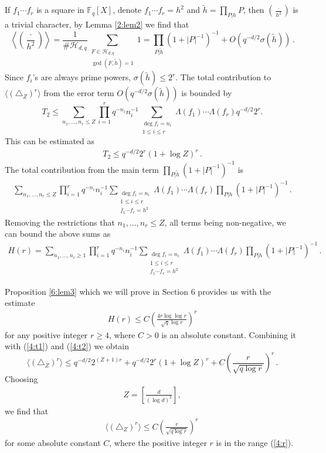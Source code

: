 \documentclass[12pt]{amsart}
\theoremstyle{plain}
\newcommand{\F}{{\mathbb F}_q}
\newcommand{\HH}{{\mathcal H}}
\begin{document}
If $f_1 \cdots f_r$ is a square in $\F[X]$, denote $f_1 \cdots f_r=h^2$ and $\widetilde{h}=\prod_{P|h}P$, then $\left(\frac{\cdot}{h^2}\right)$ is a trivial character, by Lemma \ref{2:lem2} we find that
\[ \left\langle\left(\frac{\cdot}{h^2}\right)\right \rangle = \frac{1}{\#\HH_{d,q}} \sum_{\substack{F \in \HH_{d,q}\\ \gcd(F,\widetilde{h})=1}}1= \prod_{P|\widetilde{h}}\left(1+|P|^{-1}\right)^{-1}+
O\left(q^{-d/2}\sigma(\widetilde{h})\right)\,.\]
Since $f_i$'s are always prime powers, $\sigma(\widetilde{h}) \le 2^r$. The total contribution to $\langle(\triangle_Z)^r \rangle$ from the error term $O\left(q^{-d/2}\sigma(\widetilde{h})\right)$ is bounded by
\[T_2 \le \sum_{n_1, \ldots, n_r \le Z} \prod_{i=1}^r q^{-n_i}n_i^{-1} \sum_{\substack{\deg f_i =n_i \\ 1 \le i \le r}} \Lambda(f_1) \cdots \Lambda(f_r) q^{-d/2}2^r.\]
This can be estimated as
\begin{eqnarray} \label{4:t2} T_2 \le q^{-d/2}2^r (1+\log Z)^r\,.\end{eqnarray}
The total contribution from the main term $\prod_{P|\widetilde{h}}\left(1+|P|^{-1}\right)^{-1}$ is \begin{eqnarray*} \sum_{n_1,\ldots,n_r \le Z} \prod_{i=1}^r q^{-n_i}n_i^{-1} \sum_{\substack{\deg f_i =n_i \\ 1 \le i \le r\\ f_1 \cdots f_r=h^2}} \Lambda(f_1) \cdots \Lambda(f_r)\prod_{P|h}\left(1+|P|^{-1}\right)^{-1}\,.\end{eqnarray*}
Removing the restrictions that $n_1, \ldots, n_r \le Z$, all terms being non-negative, we can bound the above sums as
\begin{eqnarray} \label{hr} H(r)=\sum_{n_1,\ldots,n_r \ge 1} \prod_{i=1}^r q^{-n_i}n_i^{-1} \sum_{\substack{\deg f_i =n_i \\ 1 \le i \le r\\ f_1 \cdots f_r=h^2}} \Lambda(f_1) \cdots \Lambda(f_r)\prod_{P|h}\left(1+|P|^{-1}\right)^{-1}\,.\end{eqnarray}

Proposition \ref{6:lem3} which we will prove in Section 6 provides us with the estimate
\begin{eqnarray*} H(r) \le C \left(\frac{4 r \log \log r}{\sqrt{q} \log r}\right)^r\end{eqnarray*}
for any positive integer $r \ge 4$, where $C>0$ is an absolute constant. Combining it with (\ref{4:t1}) and (\ref{4:t2}) we obtain
\[\langle(\triangle_Z)^r \rangle \le q^{-d/2} 2^{(Z+1)r}+q^{-d/2}2^r (1+\log Z)^r+C \left(\frac{r}{\sqrt{q \log r}}\right)^r\,.\]
Choosing
\begin{eqnarray} \label{4:z} Z=\left[\frac{d}{\left(\log d\right)^2}\right], \end{eqnarray}
we find that
\begin{eqnarray} \label{4:r-tri}\langle(\triangle_Z)^r \rangle \le C \left(\frac{r}{\sqrt{q \log r}}\right)^r\,\end{eqnarray}
for some absolute constant $C$, where the positive integer $r$ is in the range (\ref{4:r}).
\end{document}
